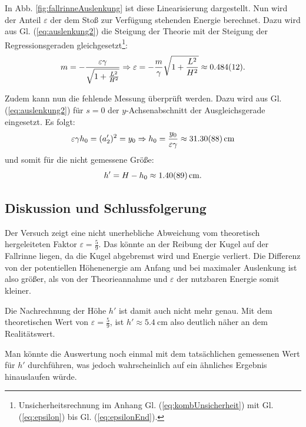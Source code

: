 	In Abb. \ref{fig:fallrinneAuslenkung} ist diese Linearisierung dargestellt.
	Nun wird der Anteil $\varepsilon$ der dem Stoß zur Verfügung stehenden Energie berechnet.
	Dazu wird aus Gl. (\ref{eq:auslenkung2}) die Steigung der Theorie mit der Steigung der Regressionsgeraden gleichgesetzt\footnote{Unsicherheitsrechnung im Anhang Gl. (\ref{eq:kombUnsicherheit}) mit Gl. (\ref{eq:epsilon}) bis Gl. (\ref{eq:epsilonEnd}).}:
	\begin{equation}
		m = -\frac{\varepsilon \gamma}{\sqrt{1 + \frac{L^2}{H^2}}} \Rightarrow \varepsilon = -\frac{m}{\gamma} \sqrt{1+\frac{L^2}{H^2}} \approx \SI{0,484 +- 0,012}{}.
	\end{equation}
	
	Zudem kann nun die fehlende Messung überprüft werden.
	Dazu wird aus Gl. (\ref{eq:auslenkung2}) für $s = 0$ der $y$-Achsenabschnitt der Ausgleichsgerade eingesetzt.
	Es folgt:
	\begin{equation}
		\varepsilon \gamma h_0 = (a'_2)^2= y_0 \Rightarrow h_0 = \frac{y_0}{\varepsilon\gamma} \approx \SI{31,30 +- 0,88}{\centi\meter}
	\end{equation}
	und somit für die nicht gemessene Größe:
	\begin{equation}
		h' = H - h_0 \approx \SI{1,40 +- 0,89}{\centi\meter}.
	\end{equation}
	
	\subsection{Diskussion und Schlussfolgerung}
	
	Der Versuch zeigt eine nicht unerhebliche Abweichung vom theoretisch hergeleiteten Faktor $\varepsilon = \frac{5}{9}$.
	Das könnte an der Reibung der Kugel auf der Fallrinne liegen, da die Kugel abgebremst wird und Energie verliert.
	Die Differenz von der potentiellen Höhenenergie am Anfang und bei maximaler Auslenkung ist also größer, als von der Theorieannahme und $\varepsilon$ der nutzbaren Energie somit kleiner.
	
	Die Nachrechnung der Höhe $h'$ ist damit auch nicht mehr genau.
	Mit dem theoretischen Wert von $\varepsilon = \frac{5}{9}$, ist $h' \approx \SI{5,4}{\centi\meter}$ also deutlich näher an dem Realitätswert.
	
	Man könnte die Auswertung noch einmal mit dem tatsächlichen gemessenen Wert für $h'$ durchführen, was jedoch wahrscheinlich auf ein ähnliches Ergebnis hinauslaufen würde.
	